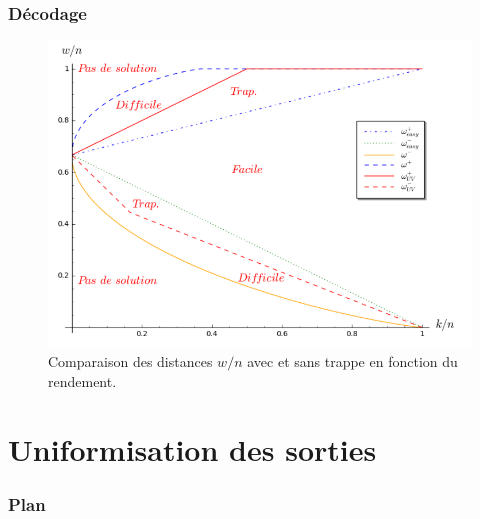 \documentclass[10pt,a4paper]{beamer}
\theoremstyle{plain}
\theoremstyle{definition}
\begin{document}
\begin{frame}
\frametitle{Décodage}
\begin{figure}[h]
\begin{center}
\includegraphics [scale=0.32]{../rapport/include/graph_ratio_w.png}
\end{center}
\caption{\scriptsize Comparaison des distances $w/n$ avec et sans trappe en fonction du rendement.}
\end{figure}
\end{frame}

\section{Uniformisation des sorties}

\begin{frame}
  \frametitle{Plan}
  \tableofcontents[currentsection,subsectionstyle=hide]
\end{frame}
\end{document}
